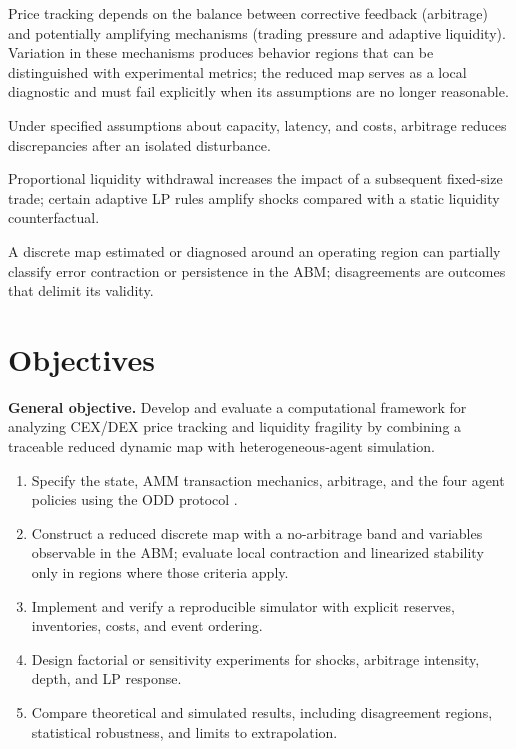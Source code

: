 Price tracking depends on the balance between corrective feedback (arbitrage) and
potentially amplifying mechanisms (trading pressure and adaptive liquidity). Variation
in these mechanisms produces behavior regions that can be distinguished with
experimental metrics; the reduced map serves as a local diagnostic and must fail
explicitly when its assumptions are no longer reasonable.

\begin{description}[style=nextline]
  \item[H1a.] Under specified assumptions about capacity, latency, and costs,
    arbitrage reduces discrepancies after an isolated disturbance.
  \item[H1b.] Proportional liquidity withdrawal increases the impact of a subsequent
    fixed-size trade; certain adaptive LP rules amplify shocks compared with a static
    liquidity counterfactual.
  \item[H1c.] A discrete map estimated or diagnosed around an operating region can
    partially classify error contraction or persistence in the ABM; disagreements are
    outcomes that delimit its validity.
\end{description}

\section{Objectives}

\textbf{General objective.} Develop and evaluate a computational framework for
analyzing CEX/DEX price tracking and liquidity fragility by combining a traceable
reduced dynamic map with heterogeneous-agent simulation.

\begin{enumerate}
  \item Specify the state, AMM transaction mechanics, arbitrage, and the four agent
    policies using the ODD protocol \cite{grimm2020odd}.
  \item Construct a reduced discrete map with a no-arbitrage band and variables
    observable in the ABM; evaluate local contraction and linearized stability only in
    regions where those criteria apply.
  \item Implement and verify a reproducible simulator with explicit reserves,
    inventories, costs, and event ordering.
  \item Design factorial or sensitivity experiments for shocks, arbitrage intensity,
    depth, and LP response.
  \item Compare theoretical and simulated results, including disagreement regions,
    statistical robustness, and limits to extrapolation.
\end{enumerate}
